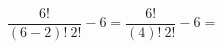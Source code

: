 \documentclass[preview]{standalone}
\begin{document}
\begin{center}
\[ \frac{ \: 6! \: }{(6-2)! \: 2!} - 6 = \frac{ \: 6! \: }{(4)! \: 2!} - 6 = \]
\end{center}
\end{document}
